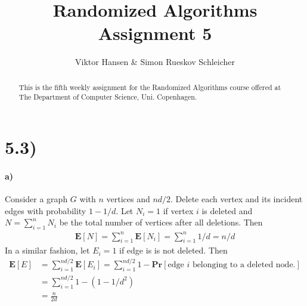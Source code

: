 \documentclass[12pt]{article}
\begin{document}
\nocite{*}


\title{Randomized Algorithms \\
       Assignment 5}

\author{Viktor Hansen \& Simon Rueskov Schleicher}

\maketitle

\begin{abstract}
  This is the fifth weekly assignment for the Randomized Algorithms course offered at The Department of Computer Science, Uni. Copenhagen.
\end{abstract}

\pagebreak

\section*{5.3)}
\paragraph{a)} Consider a graph $G$ with $n$ vertices and $nd/2$. Delete each vertex and its incident edges with probability $1-1/d$. Let $N_i=1$ if vertex $i$ is deleted and $N=\sum_{i=1}^{n} N_i$ be the total number of vertices after all deletions. Then
\begin{align*}
\mathbf{E}[N] = \sum_{i=1}^{n} \mathbf{E}[N_i] = \sum_{i=1}^{n} 1/d = n/d
\end{align*}
In a similar fashion, let $E_i=1$ if edge is is not deleted. Then
\begin{align*}
\mathbf{E}[E] &= \sum_{i=1}^{nd/2} \mathbf{E}[E_i] = \sum_{i=1}^{nd/2} 1-\mathbf{Pr}\left[ \text{edge } i \text{ belonging to a deleted node.} \right] \\
&= \sum_{i=1}^{nd/2} 1-(1-1/d^2) \\
&= \frac{n}{2d}
\end{align*}
\end{document}
